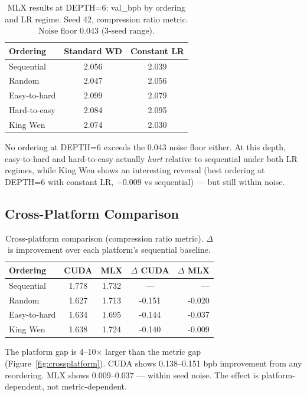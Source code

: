 \documentclass{article}
\begin{document}
\begin{table}[h]
\centering
\caption{MLX results at DEPTH=6: val\_bpb by ordering and LR regime.
Seed 42, compression ratio metric. Noise floor 0.043 (3-seed range).}
\label{tab:mlx6}
\begin{tabular}{lcc}
\toprule
Ordering & Standard WD & Constant LR \\
\midrule
Sequential       & 2.056 & 2.039 \\
Random           & 2.047 & 2.056 \\
Easy-to-hard     & 2.099 & 2.079 \\
Hard-to-easy     & 2.084 & 2.095 \\
King Wen         & 2.074 & 2.030 \\
\bottomrule
\end{tabular}
\end{table}

No ordering at DEPTH=6 exceeds the 0.043 noise floor either. At this
depth, easy-to-hard and hard-to-easy actually \emph{hurt} relative to
sequential under both LR regimes, while King Wen shows an interesting
reversal (best ordering at DEPTH=6 with constant LR, $-0.009$ vs
sequential) --- but still within noise.

\subsection{Cross-Platform Comparison}

\begin{table}[h]
\centering
\caption{Cross-platform comparison (compression ratio metric).
$\Delta$ is improvement over each platform's sequential baseline.}
\label{tab:crossplatform}
\begin{tabular}{lcccr}
\toprule
Ordering & CUDA & MLX & $\Delta$ CUDA & $\Delta$ MLX \\
\midrule
Sequential   & 1.778 & 1.732 & ---    & ---    \\
Random       & 1.627 & 1.713 & -0.151 & -0.020 \\
Easy-to-hard & 1.634 & 1.695 & -0.144 & -0.037 \\
King Wen     & 1.638 & 1.724 & -0.140 & -0.009 \\
\bottomrule
\end{tabular}
\end{table}

The platform gap is 4--10$\times$ larger than the metric gap
(Figure~\ref{fig:crossplatform}).
CUDA shows 0.138--0.151 bpb improvement from any reordering.
MLX shows 0.009--0.037 --- within seed noise.
The effect is platform-dependent, not metric-dependent.
\end{document}
